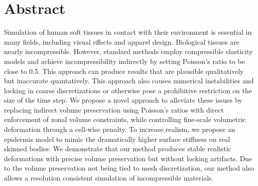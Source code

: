 
\chapter{Abstract}

Simulation of human soft tissues in contact with their environment
is essential in many fields, including visual effects and apparel
design.  Biological tissues are nearly incompressible. However,
standard methods employ compressible elasticity models and achieve
incompressibility indirectly by setting Poisson's ratio to be close
to 0.5.  This approach can produce results that are plausible
qualitatively but inaccurate quantatively. This approach also causes
numerical instabilities and locking in coarse discretizations or
otherwise pose a prohibitive restriction on the size of the time
step.
%
We propose a novel approach to alleviate these issues by
replacing indirect volume preservation using Poisson's ratios with
direct enforcement of zonal volume constraints, while controlling
fine-scale volumetric deformation through a cell-wise penalty.
To increase realism, we propose an epidermis model to mimic the
dramatically higher surface stiffness on real skinned bodies.
We demonstrate that our method produces stable realistic
deformations with precise volume preservation but without locking
artifacts. 
Due to the volume preservation not being tied to mesh discretization, our method also allows a
resolution consistent simulation of incompressible materials.

